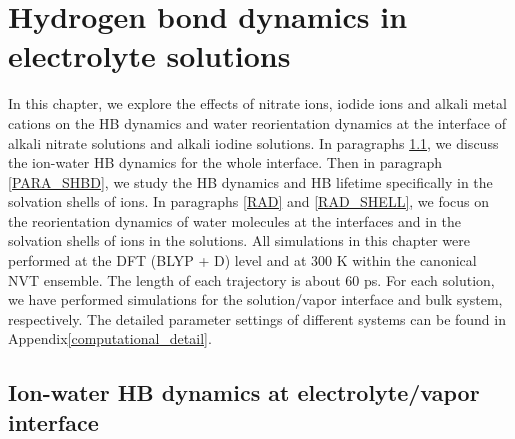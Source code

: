 \chapter{Hydrogen bond dynamics in electrolyte solutions}\label{CHAPTER_HB_SOLUTIONS}
In this chapter, we explore the effects of nitrate ions, iodide ions and alkali metal cations 
on the HB dynamics and water reorientation dynamics at the interface of alkali nitrate solutions and alkali
iodine solutions. %
In paragraphs \ref{HBD_ITP}, we discuss the ion-water HB dynamics for the whole interface. 
Then in paragraph \ref{PARA_SHBD}, we study the HB dynamics and HB lifetime specifically in the solvation shells of ions.
In paragraphs \ref{RAD} and \ref{RAD_SHELL}, we focus on the reorientation dynamics of water molecules at the interfaces
and in the solvation shells of ions in the solutions.
All simulations in this chapter were performed at the DFT (BLYP + D) level and at 300 K within the canonical NVT ensemble.
The length of each trajectory is about 60 ps.
For each solution, we have performed simulations for the solution/vapor interface and bulk system, respectively. 
The detailed parameter settings of different systems can be found in Appendix\thinspace\ref{computational_detail}.

\section{Ion-water HB dynamics at electrolyte/vapor interface}\label{HBD_ITP}
